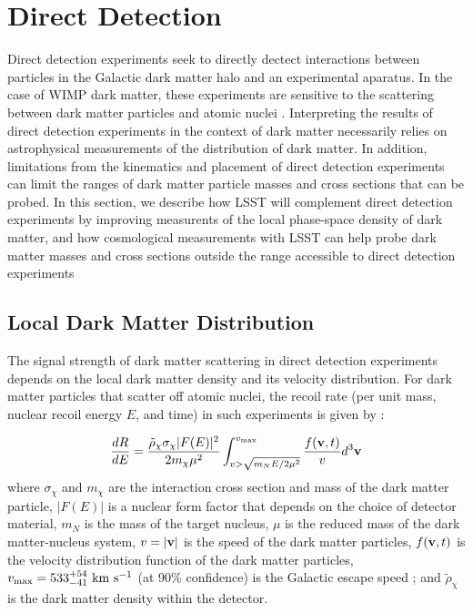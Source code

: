 
\def\rhodm{\rho_\mathrm{\chi}}
\def\rhodmlab{\tilde{\rho}_\mathrm{\chi}}
\def\rhodmext{\rho_\mathrm{\chi,ext}}

\section{Direct Detection }
\label{sec:direct}

Direct detection experiments seek to directly dectect interactions between particles in the Galactic dark matter halo and an experimental aparatus. In the case of WIMP dark matter, these experiments are sensitive to the scattering between dark matter particles and atomic nuclei \citep[\eg,][]{1509.08767}.
Interpreting the results of direct detection experiments in the context of dark matter necessarily relies on astrophysical measurements of the distribution of dark matter.
In addition, limitations from the kinematics and placement of direct detection experiments can limit the ranges of dark matter particle masses and cross sections that can be probed.
In this section, we describe how LSST will complement direct detection experiments by improving measurents of the local phase-space density of dark matter, and how cosmological measurements with LSST can help probe dark matter  masses and cross sections outside the range accessible to direct detection experiments


\subsection{Local Dark Matter Distribution }

The signal strength of dark matter scattering in direct detection experiments depends on the local dark matter density and its velocity distribution. 
For dark matter particles that scatter off atomic nuclei, the recoil rate (per unit mass, nuclear recoil energy $E$, and time) in such experiments is given by \citep[\eg,][]{1996APh.....6...87L}: 

\begin{equation}
\frac{dR}{dE} = \frac{\rhodmlab \sigma_\chi |F(E)|^2}{2 m_\chi \mu^2} \int_{v>\sqrt{m_N E/2\mu^2}}^{v_\mathrm{max}} \frac{f({\bf v},t)}{v}d^3 {\bf v} 
\label{eqn:recoilrate} 
\end{equation} 
where $\sigma_\chi$ and $m_\chi$ are the interaction cross section and mass of the dark matter particle, $|F(E)|$ is a nuclear form factor that depends on the choice of detector material, $m_N$ is the mass of the target nucleus, $\mu$ is the reduced mass of the dark matter-nucleus system, $v = |{\bf v}|$ is the speed of the dark matter particles, $f({\bf v},t)$ is the velocity distribution function of the dark matter particles, $v_\mathrm{max} = 533^{+54}_{-41}\mathrm{\,\mathrm{\,km}\,\mathrm{\,s}^{-1}}$ (at 90\% confidence) is the Galactic escape speed \citep{2014AA...562A..91P}; and $\rhodmlab$ is the dark matter density within the detector. 
 
